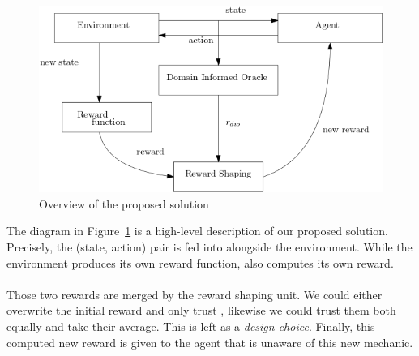 \begin{figure}[H]
  \centering
  \includegraphics[scale=0.45]{figures/overview.png}
  \caption{Overview of the proposed solution}
  \label{fig:overview}
\end{figure}


The diagram in Figure~\ref{fig:overview} is a high-level description of our proposed solution. 
%
Precisely, the (state, action) pair is fed into \dio{} alongside the environment. While the environment produces its own 
reward function, \dio{} also computes its own reward. 

\paragraph{} Those two rewards are merged by the reward shaping unit. We could either 
overwrite the initial reward and only trust \dio{}, likewise we could trust them both equally and take their average. This is left as a \emph{design choice}. 
Finally, this computed new reward is given to the agent that is unaware of this new mechanic. 
